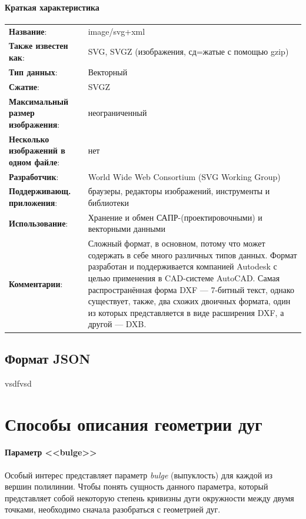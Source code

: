 \paragraph{Краткая характеристика}

\begin{longtable}{p{110pt} p{340pt}}
	\label{tab:svg}
	\centering
	\textbf{Название}:&image/svg+xml\\
	\textbf{Также известен как}:&SVG, SVGZ (изображения, сд=жатые с помощью gzip)\\
	\textbf{Тип данных}:&Векторный\\
	\textbf{Сжатие}:&SVGZ\\
	\textbf{Максимальный размер изображения}:&неограниченный\\
	\textbf{Несколько изображений в одном файле}:&нет\\
	\textbf{Разработчик}:&World Wide Web Consortium (SVG Working Group)\\
	\textbf{Поддерживающ. приложения}:&браузеры, редакторы изображений, инструменты и библиотеки\\
	\textbf{Использование}:&Хранение и обмен САПР-(проектировочными) и векторными данными\\
	\textbf{Комментарии}:&Сложный формат, в основном, потому что может содержать в себе много различных типов данных. Формат разработан и поддерживается компанией Autodesk с целью применения в CAD-системе AutoCAD. Самая распространённая форма DXF --- 7-битный текст, однако существует, также, два схожих двоичных формата, один из которых представляется в виде расширения DXF, а другой --- DXB.\\
\end{longtable}

\subsection{Формат JSON}
vsdfvsd

\section{Способы описания геометрии дуг}

\paragraph{Параметр <<bulge>>}\label{sec:bulge}

Особый интерес представляет параметр \textit{bulge} (выпуклость) для каждой из вершин полилинии.
Чтобы понять сущность данного параметра, который представляет собой некоторую степень кривизны дуги окружности между двумя точками, необходимо сначала разобраться с геометрией дуг.

